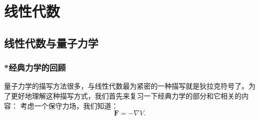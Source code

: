 \documentclass[../main.tex]{subfiles}
\begin{document}
\setcounter{chapter}{2}
\chapter{线性代数}\label{cha:linear_algebra}
\section{线性代数与量子力学}
\subsection{*经典力学的回顾}
    量子力学的描写方法很多，与线性代数最为紧密的一种描写就是狄拉克符号了。为了更好地理解这种描写方式，我们首先来复习一下经典力学的部分和它相关的内容：
    考虑一个保守力场，我们知道：
    \begin{equation}
        \mathbf{F}= -\nabla V.
    \end{equation}
\biblio
\end{document}
